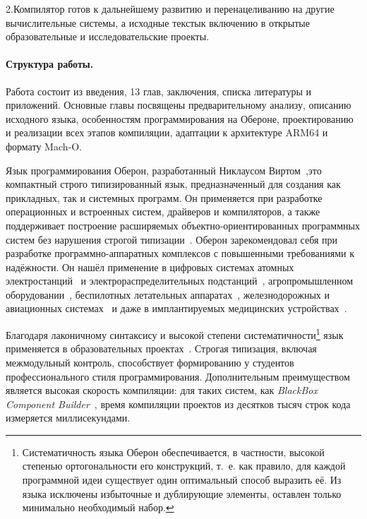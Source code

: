 \documentclass[utf8]{lgu}
\newcommand{\tire}{\unskip\nobreak\thinspace\textemdash\thinspace}
\begin{document}
2.\hspace{0.5em}Компилятор готов к дальнейшему развитию и перенацеливанию на другие вычислительные системы, а исходные тексты\tire к включению в открытые образовательные и исследовательские проекты.

\paragraph{Структура работы.}

Работа состоит из введения, 13 глав, заключения, списка литературы и приложений. Основные главы посвящены предварительному анализу, описанию исходного языка, особенностям программирования на Обероне, проектированию и реализации всех этапов компиляции, адаптации к архитектуре ARM64 и формату Mach‑O.

\newpage
{}
{}

\firstparskip Язык программирования Оберон, разработанный Никлаусом Виртом~\cite{WirthOberon},\tire это компактный строго типизированный язык, предназначенный для создания как прикладных, так и системных программ. Он применяется при разработке операционных и встроенных систем, драйверов и компиляторов, а также поддерживает построение расширяемых объектно-ориен\-ти\-ро\-ван\-ных программных систем без нарушения строгой типизации~\cite{ETHOS}. Оберон зарекомендовал себя при разработке программно-аппаратных комплексов с повышенными требованиями к надёжности. Он нашёл применение в цифровых системах атомных электростанций~\cite{OberonAES} и электрораспределительных подстанций~\cite{OberonKaliningrad}, агропромышленном оборудовании~\cite{OberonAgro}, беспилотных летательных аппаратах~\cite{OberonBPLA1,OberonBPLA2}, железнодорожных и авиационных системах~\cite{OberonAvia} и даже в имплантируемых медицинских устройствах~\cite{Skulski,Astrobe,OberonRTS,OberonApplications}.

Благодаря лаконичному синтаксису и высокой степени систематичности\footnote{Систематичность языка Оберон обеспечивается, в частности, высокой степенью ортогональности его конструкций, т.~е. как правило, для каждой программной идеи существует один оптимальный способ выразить её. Из языка исключены избыточные и дублирующие элементы, оставлен только минимально необходимый набор.} язык применяется в образовательных проектах~\cite{OxfordOberon,WirthPIO,OberonCourses}. Строгая типизация, включая межмодульный контроль, способствует формированию у студентов профессионального стиля программирования. Дополнительным преимуществом является высокая скорость компиляции: для таких систем, как \textit{BlackBox Component Builder}~\cite{BlackBox,BlackBoxWiki}, время компиляции проектов из десятков тысяч строк кода измеряется миллисекундами.
\end{document}
